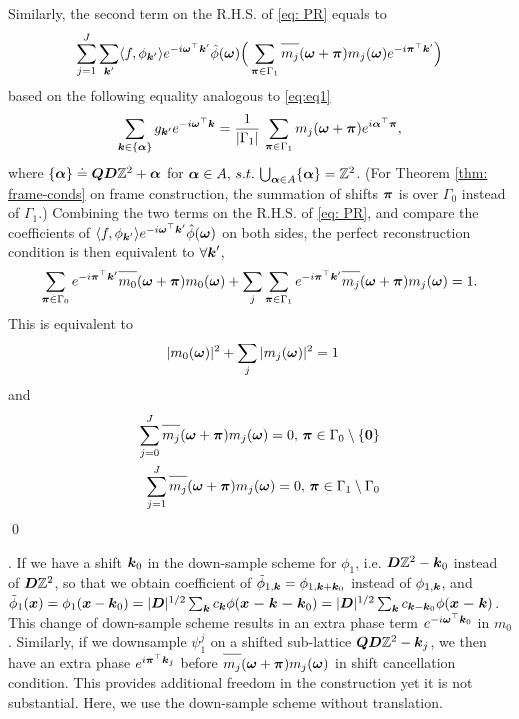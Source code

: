 Similarly, the second term on the R.H.S. of \eqref{eq: PR} equals to 
\begin{align*}
\sum_{j=1}^J\sum_{\V{k}'}\langle f,\phi_{\V{k}'}\rangle e^{-i\V{\omega}^\top \V{k}'}\hat{\phi}(\V{\omega})\Big(\sum_{\V{\pi}\in\Gamma_1} \overlinespace{m_j}(\V{\omega}+\V{\pi})m_j(\V{\omega})e^{-i\V{\pi}^\top\V{k}'} \Big)
\end{align*}
based on the following equality analogous to \eqref{eq:eq1}
\begin{align}
\sum_{\boldsymbol{k}\in\{\boldsymbol{\alpha}\}} g_{\boldsymbol{k}'} e^{-i\boldsymbol{\omega}^\top\boldsymbol{k}} = \frac{1}{|\Gamma_1|}\, \sum_{\boldsymbol{\pi}\in\Gamma_1} m_j(\boldsymbol{\omega} + \boldsymbol{\pi})e^{i\boldsymbol{\alpha}^\top\boldsymbol{\pi}},
\end{align}
where $\{\boldsymbol{\alpha}\} \doteq \boldsymbol{QD}\mathbb{Z}^2 + \boldsymbol{\alpha}$ for $\boldsymbol{\alpha}\in A,\, s.t.\, \bigcup_{\boldsymbol{\alpha}\in A} \{\boldsymbol{\alpha}\} = \mathbb{Z}^2$.
(For Theorem \ref{thm: frame-conds} on frame construction, the summation of shifts $\boldsymbol{\pi}$ is over $\Gamma_0$ instead of $\Gamma_1$.) 
Combining the two terms on the R.H.S. of \eqref{eq: PR}, and compare the coefficients of $\langle f,\phi_{\boldsymbol{k}'}\rangle e^{-i\boldsymbol{\omega}^\top \boldsymbol{k}'}\hat{\phi}(\boldsymbol{\omega})$ on both sides, the perfect reconstruction condition is then equivalent to $\forall \boldsymbol{k}'$,
\begin{align*}
\sum_{\V{\pi}\in\Gamma_0}e^{-i\V{\pi}^\top\V{k}'}\overlinespace{m_0}(\V{\omega}+\V{\pi})m_0(\V{\omega}) + \sum_j\sum_{\V{\pi}\in\Gamma_1} e^{-i\V{\pi}^\top\V{k}'}\overlinespace{m_j}(\V{\omega}+\V{\pi})m_j(\V{\omega}) = 1. 
\end{align*} 
This is equivalent to 
\begin{align*}
&|m_0(\boldsymbol{\omega})|^2 + \sum_j|m_j(\boldsymbol{\omega})|^2 = 1
\end{align*}
and
\begin{align*}
\sum_{j=0}^J\overlinespace{m_j}(\V{\omega}+\V{\pi})m_j(\V{\omega}) = 0, 
\,\V{\pi}\in \Gamma_0\setminus\{\V{0}\}\\
\sum_{j=1}^J\overlinespace{m_j}(\V{\omega}+\V{\pi})m_j(\V{\omega}) = 0,\,\V{\pi}\in \Gamma_1\setminus \Gamma_0
\end{align*}
\qed

.
If we have a shift $\boldsymbol{k}_0$ in the down-sample scheme for $\phi_1$, i.e. $\boldsymbol{D}\mathbb{Z}^2 - \boldsymbol{k}_0$ instead of $\boldsymbol{D}\mathbb{Z}^2$, so that we obtain coefficient of $\tilde{\phi}_{1,\boldsymbol{k}} = \phi_{1,\boldsymbol{k}+\boldsymbol{k}_0}$ instead of $\phi_{1,\boldsymbol{k}}$, and $\tilde{\phi}_1(\boldsymbol{x}) =\phi_1(\boldsymbol{x}-\boldsymbol{k}_0)= |\boldsymbol{D}|^{1/2}\sum_{\boldsymbol{k}}c_{\boldsymbol{k}}\phi(\boldsymbol{x-k-k}_0) = |\boldsymbol{D}|^{1/2}\sum_{\boldsymbol{k}}c_{\boldsymbol{k}-\boldsymbol{k}_0}\phi(\boldsymbol{x-k})$. This change of down-sample scheme results in an extra phase term $e^{-i\boldsymbol{\omega}^\top \boldsymbol{k}_0}$ in $m_0$. 
Similarly, if we downsample $\psi_1^j$ on a shifted sub-lattice $\boldsymbol{QD}\mathbb{Z}^2-\boldsymbol{k}_j$, we then have an extra phase $e^{i\boldsymbol{\pi}^\top\boldsymbol{k}_j}$ before $\overlinespace{m_j}(\V{\omega}+\V{\pi})m_j(\V{\omega})$ in shift cancellation condition. This provides additional freedom in the construction yet it is not substantial. Here, we use the down-sample scheme without translation.
